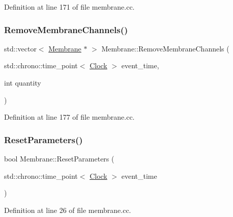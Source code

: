 Definition at line 171 of file membrane.\+cc.

\mbox{\label{class_membrane_ac33ffd86416112420dc5b0576287c44d}} 
\subsubsection{\texorpdfstring{Remove\+Membrane\+Channels()}{RemoveMembraneChannels()}}
{\footnotesize\ttfamily std\+::vector$<$ \mbox{\hyperlink{class_membrane}{Membrane}} $\ast$ $>$ Membrane\+::\+Remove\+Membrane\+Channels (\begin{DoxyParamCaption}\item[{std\+::chrono\+::time\+\_\+point$<$ \mbox{\hyperlink{universe_8h_a0ef8d951d1ca5ab3cfaf7ab4c7a6fd80}{Clock}} $>$}]{event\+\_\+time,  }\item[{int}]{quantity }\end{DoxyParamCaption})}



Definition at line 177 of file membrane.\+cc.

\mbox{\label{class_membrane_a9c49462cf63495381a52e2defc80b1e4}} 
\subsubsection{\texorpdfstring{Reset\+Parameters()}{ResetParameters()}}
{\footnotesize\ttfamily bool Membrane\+::\+Reset\+Parameters (\begin{DoxyParamCaption}\item[{std\+::chrono\+::time\+\_\+point$<$ \mbox{\hyperlink{universe_8h_a0ef8d951d1ca5ab3cfaf7ab4c7a6fd80}{Clock}} $>$}]{event\+\_\+time }\end{DoxyParamCaption})}



Definition at line 26 of file membrane.\+cc.


